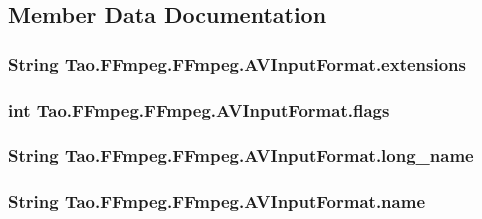 \subsection{Member Data Documentation}
\hypertarget{struct_tao_1_1_f_fmpeg_1_1_f_fmpeg_1_1_a_v_input_format_a22e4f2f98f293d3f42824e3451ec942f}{
\subsubsection[{extensions}]{\setlength{\rightskip}{0pt plus 5cm}String {\bf Tao.FFmpeg.FFmpeg.AVInputFormat.extensions}}}
\label{struct_tao_1_1_f_fmpeg_1_1_f_fmpeg_1_1_a_v_input_format_a22e4f2f98f293d3f42824e3451ec942f}
\hypertarget{struct_tao_1_1_f_fmpeg_1_1_f_fmpeg_1_1_a_v_input_format_ac393d3834db1e4ff22807535818b1028}{
\subsubsection[{flags}]{\setlength{\rightskip}{0pt plus 5cm}int {\bf Tao.FFmpeg.FFmpeg.AVInputFormat.flags}}}
\label{struct_tao_1_1_f_fmpeg_1_1_f_fmpeg_1_1_a_v_input_format_ac393d3834db1e4ff22807535818b1028}
\hypertarget{struct_tao_1_1_f_fmpeg_1_1_f_fmpeg_1_1_a_v_input_format_a78c344da058cb4a20652dee3c58a19c9}{
\subsubsection[{long\_\-name}]{\setlength{\rightskip}{0pt plus 5cm}String {\bf Tao.FFmpeg.FFmpeg.AVInputFormat.long\_\-name}}}
\label{struct_tao_1_1_f_fmpeg_1_1_f_fmpeg_1_1_a_v_input_format_a78c344da058cb4a20652dee3c58a19c9}
\hypertarget{struct_tao_1_1_f_fmpeg_1_1_f_fmpeg_1_1_a_v_input_format_ae7ea1d279372bdeb9a4f096cd453da51}{
\subsubsection[{name}]{\setlength{\rightskip}{0pt plus 5cm}String {\bf Tao.FFmpeg.FFmpeg.AVInputFormat.name}}}
